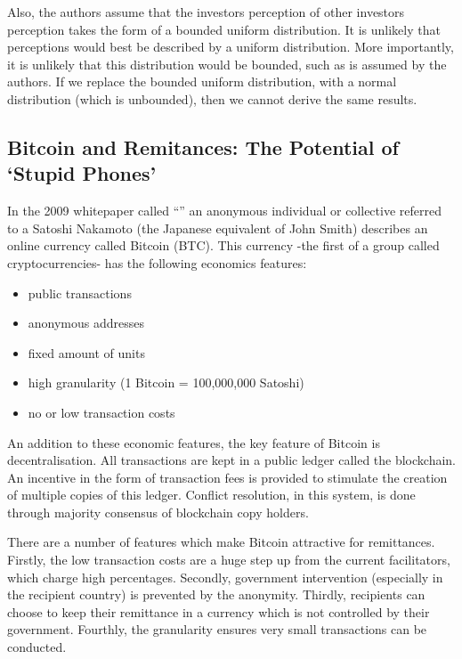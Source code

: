 \documentclass[a4paper]{report}
\begin{document}
\begin{refsection}
Also, the authors assume that the investors perception of other investors perception takes the form of a bounded uniform distribution.
It is unlikely that perceptions would best be described by a uniform distribution.
More importantly, it is unlikely that this distribution would be bounded, such as is assumed by the authors.
If we replace the bounded uniform distribution, with a normal distribution (which is unbounded),
then we cannot derive the same results.

\nocite{taleb2010black}
\printbibliography
\end{refsection}

\begin{refsection}
\chapter{Bitcoin and Remitances: The Potential of `Stupid Phones'}
\label{btc}
In the 2009 whitepaper \parencite{nakamoto2008bitcoin} called ``'' an anonymous individual or collective referred to a Satoshi Nakamoto (the Japanese equivalent of John Smith) describes an online currency called Bitcoin (BTC). 
This currency -the first of a group called cryptocurrencies- has the following economics features:

\begin{itemize}
\item public transactions
\item anonymous addresses
\item fixed amount of units
\item high granularity (1 Bitcoin = 100,000,000 Satoshi)
\item no or low transaction costs
\end{itemize}

An addition to these economic features, the key feature of Bitcoin is decentralisation.
All transactions are kept in a public ledger called the blockchain. An incentive in the form of transaction fees is provided to stimulate the creation of multiple copies of this ledger.
Conflict resolution, in this system, is done through majority consensus of blockchain copy holders.

There are a number of features which make Bitcoin attractive for remittances. Firstly, the low transaction costs are a huge step up from the current facilitators, which charge high percentages. Secondly, government intervention (especially in the recipient country) is prevented by the anonymity. Thirdly, recipients can choose to keep their remittance in a currency which is not controlled by their government. Fourthly, the granularity ensures very small transactions can be conducted.


\end{refsection}
\end{document}

